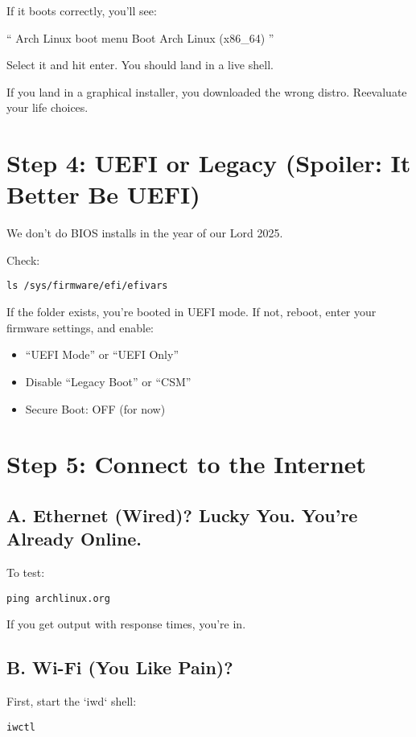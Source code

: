 \documentclass[12pt]{book}
\begin{document}
If it boots correctly, you'll see:

``
Arch Linux boot menu
Boot Arch Linux (x86\_64)
''


Select it and hit enter. You should land in a live shell.

If you land in a graphical installer, you downloaded the wrong distro. Reevaluate your life choices.

\section*{Step 4: UEFI or Legacy (Spoiler: It Better Be UEFI)}

We don't do BIOS installs in the year of our Lord 2025.

Check:
\begin{lstlisting}
ls /sys/firmware/efi/efivars
\end{lstlisting}

If the folder exists, you’re booted in UEFI mode.  
If not, reboot, enter your firmware settings, and enable:

\begin{itemize}
  \item “UEFI Mode” or “UEFI Only”
  \item Disable “Legacy Boot” or “CSM”
  \item Secure Boot: OFF (for now)
\end{itemize}

\section*{Step 5: Connect to the Internet}

\subsection*{A. Ethernet (Wired)? Lucky You. You're Already Online.}

To test:
\begin{lstlisting}
ping archlinux.org
\end{lstlisting}

If you get output with response times, you’re in.

\subsection*{B. Wi-Fi (You Like Pain)?}

First, start the `iwd` shell:
\begin{lstlisting}
iwctl
\end{lstlisting}
\end{document}
